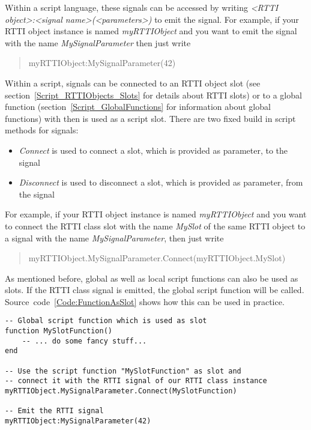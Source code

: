 Within a script language, these signals can be accessed by writing \emph{<RTTI object>:<signal name>(<parameters>)} to emit the signal. For example, if your RTTI object instance is named \emph{myRTTIObject} and you want to emit the signal with the name \emph{MySignalParameter} then just write \begin{quote}myRTTIObject:MySignalParameter(42)\end{quote}

Within a script, signals can be connected to an RTTI object slot (see section~\ref{Script_RTTIObjects_Slots} for details about RTTI slots) or to a global function (section~\ref{Script_GlobalFunctions} for information about global functions) with then is used as a script slot. There are two fixed build in script methods for signals:
\begin{itemize}
\item{\emph{Connect} is used to connect a slot, which is provided as parameter, to the signal}
\item{\emph{Disconnect} is used to disconnect a slot, which is provided as parameter, from the signal}
\end{itemize}

For example, if your RTTI object instance is named \emph{myRTTIObject} and you want to connect the RTTI class slot with the name \emph{MySlot} of the same RTTI object to a signal with the name \emph{MySignalParameter}, then just write \begin{quote}myRTTIObject.MySignalParameter.Connect(myRTTIObject.MySlot)\end{quote}

As mentioned before, global as well as local script functions can also be used as slots. If the RTTI class signal is emitted, the global script function will be called. Source~code~\ref{Code:FunctionAsSlot} shows how this can be used in practice.
\begin{lstlisting}[float=htb,label=Code:FunctionAsSlot,caption={Function as slot}]
-- Global script function which is used as slot
function MySlotFunction()
	-- ... do some fancy stuff...
end

-- Use the script function "MySlotFunction" as slot and
-- connect it with the RTTI signal of our RTTI class instance
myRTTIObject.MySignalParameter.Connect(MySlotFunction)

-- Emit the RTTI signal
myRTTIObject:MySignalParameter(42)
\end{lstlisting}
